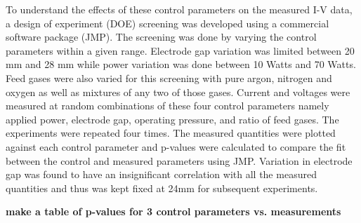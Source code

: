 \documentclass[12pt]{iopart}
\begin{document}
To understand the effects of these control parameters on the measured I-V data, a design of experiment (DOE) screening was developed using a commercial software package (JMP). The screening was done by varying the control parameters within a given range. Electrode gap variation was limited between 20 mm and 28 mm while power variation was done between 10 Watts and 70 Watts. Feed gases were also varied for this screening with pure argon, nitrogen and oxygen as well as mixtures of any two of those gases. Current and voltages were measured at random combinations of these four control parameters namely applied power, electrode gap, operating pressure, and ratio of feed gases. The experiments were repeated four times. The measured quantities were plotted against each control parameter and p-values were calculated to compare the fit between the control and measured parameters using JMP. Variation in electrode gap was found to have an insignificant correlation with all the measured quantities and thus was kept fixed at 24mm for subsequent experiments.  

\textbf{make a table of p-values for 3 control parameters vs. measurements}\\
\end{document}
